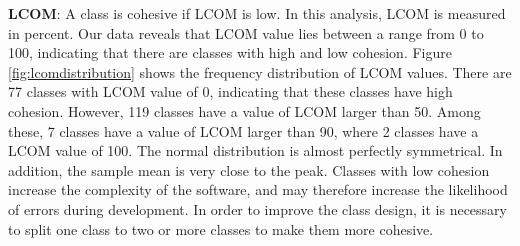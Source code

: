 \begin{table}[]
\end{table}


\textbf{LCOM}: A class is cohesive if LCOM is low. In this analysis, LCOM is measured in percent. Our data reveals that LCOM value lies between a range from 0 to 100, indicating that there are classes with high and low cohesion. Figure \ref{fig:lcomdistribution} shows the frequency distribution of LCOM values. There are 77 classes with LCOM value of 0, indicating that these classes have high cohesion. However, 119 classes have a value of LCOM larger than 50. Among these, 7 classes have a value of LCOM larger than 90, where 2 classes have a LCOM value of 100. The normal distribution is almost perfectly symmetrical. In addition, the sample mean is very close to the peak. Classes with low cohesion increase the complexity of the software, and may therefore increase the likelihood of errors during development. In order to improve the class design, it is necessary to split one class to two or more classes to make them more cohesive.


